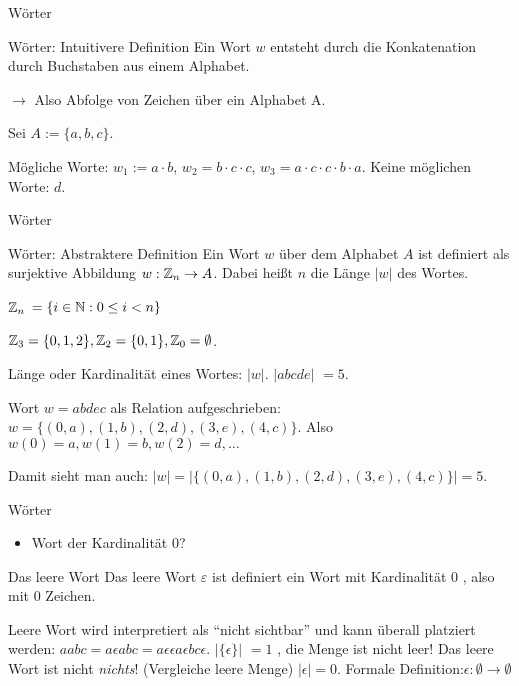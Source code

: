 \documentclass[]{beamer}
\begin{document}
\begin{frame}{Wörter}
	\begin{block}{Wörter: Intuitivere Definition}
		Ein Wort $w$ entsteht durch die Konkatenation durch Buchstaben aus einem Alphabet.
	\end{block}

	$\rightarrow$ Also Abfolge von Zeichen über ein Alphabet A.

	\pause Sei $A := \{a, b, c\}$.

	\begin{itemize}
		\pitem Mögliche Worte: \pause $w_1 := a \cdot b$\pause , $w_2 = b \cdot c \cdot c$\pause , $w_3 = a \cdot c \cdot c \cdot b \cdot a$.
		\pitem Keine möglichen Worte: \pause $d$.
		\end{itemize}
\end{frame}

\begin{frame}{Wörter}
	\begin{block}{Wörter: Abstraktere Definition}
		Ein Wort $w$  über dem Alphabet $A$  ist definiert als surjektive Abbildung  $w : \mathbb{Z}_n \rightarrow A$. Dabei heißt $n$ die Länge $|w|$ des Wortes.
	\end{block}

	\begin{itemize}
		\pitem $\mathbb{Z}_n$  $ = \{i \in \mathbb{N} : 0 \leq i < n \}$
		
		\pause $\mathbb{Z}_3  = \{0, 1, 2\},  \mathbb{Z}_2 = \{0, 1\}, \mathbb{Z}_0 = \emptyset$.
		
		\pitem Länge oder Kardinalität eines Wortes:  $|w|$. \pause $|abcde|$ $= 5$.
		
		\pitem Wort $w = abdec$ als Relation aufgeschrieben: \pause $w = \{(0, a), (1, b), (2, d), (3, e), (4, c)\}$.  Also $w(0) = a, w(1) = b, w(2) = d, \dots$
		
		\pause Damit sieht man auch: $|w| = |\{(0, a), (1, b), (2, d), (3, e), (4, c)\}| = 5$.
	\end{itemize}
\end{frame}

\begin{frame}{Wörter}
	\begin{itemize}
		\item Wort der Kardinalität 0?
	\end{itemize}

	\pause

	\begin{block}{Das leere Wort}
		Das leere Wort $\varepsilon$ ist definiert ein Wort mit Kardinalität 0 , also mit 0 Zeichen.
	\end{block}

	\begin{itemize}
		\pitem Leere Wort wird interpretiert als ``nicht sichtbar'' und kann überall platziert werden\pause : $aabc = a\epsilon abc = a\epsilon\epsilon a\epsilon bc \epsilon$.
		\pitem $|\{\epsilon\}|$ \pause $ = 1$ , die Menge ist nicht leer! Das leere Wort ist nicht \emph{nichts}! (Vergleiche leere Menge)
		\pitem $|\epsilon| = 0$.
		\pitem Formale Definition:\pause $\epsilon : \emptyset \rightarrow \emptyset $
	\end{itemize}
\end{frame}
\end{document}
